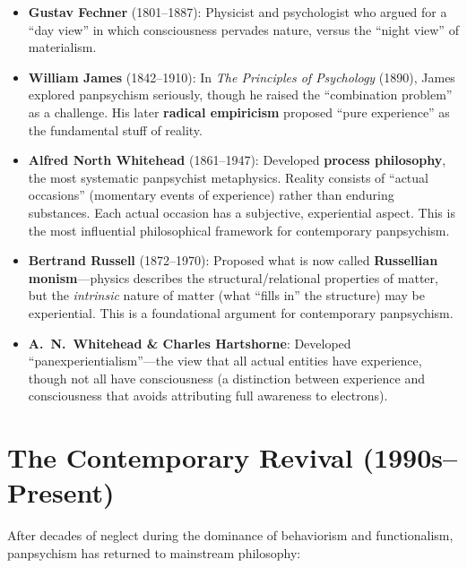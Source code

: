 \documentclass[11pt,a4paper]{report}
\begin{document}
\begin{histbox}
\begin{itemize}[leftmargin=1.5em]
  \item \textbf{Gustav Fechner} (1801--1887): Physicist and psychologist who argued for a ``day view'' in which consciousness pervades nature, versus the ``night view'' of materialism.
  \item \textbf{William James} (1842--1910): In \textit{The Principles of Psychology} (1890), James explored panpsychism seriously, though he raised the ``combination problem'' as a challenge. His later \textbf{radical empiricism} proposed ``pure experience'' as the fundamental stuff of reality.
  \item \textbf{Alfred North Whitehead} (1861--1947): Developed \textbf{process philosophy}, the most systematic panpsychist metaphysics. Reality consists of ``actual occasions'' (momentary events of experience) rather than enduring substances. Each actual occasion has a subjective, experiential aspect. This is the most influential philosophical framework for contemporary panpsychism.
  \item \textbf{Bertrand Russell} (1872--1970): Proposed what is now called \textbf{Russellian monism}---physics describes the structural/relational properties of matter, but the \emph{intrinsic} nature of matter (what ``fills in'' the structure) may be experiential. This is a foundational argument for contemporary panpsychism.
  \item \textbf{A.\ N.\ Whitehead \& Charles Hartshorne}: Developed ``panexperientialism''---the view that all actual entities have experience, though not all have consciousness (a distinction between experience and consciousness that avoids attributing full awareness to electrons).
\end{itemize}
\end{histbox}

\section{The Contemporary Revival (1990s--Present)}

After decades of neglect during the dominance of behaviorism and functionalism, panpsychism has returned to mainstream philosophy:
\end{document}

